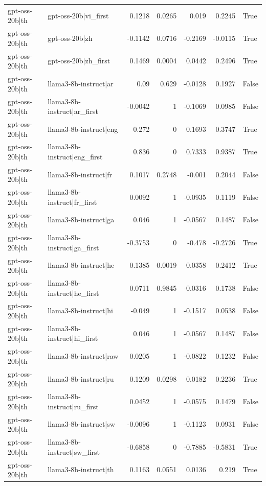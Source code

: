 \begin{table}
\begin{tabular}{l l r r r r l}
gpt-oss-20b|th & gpt-oss-20b|vi_first & 0.1218 & 0.0265 & 0.019 & 0.2245 & True \\
gpt-oss-20b|th & gpt-oss-20b|zh & -0.1142 & 0.0716 & -0.2169 & -0.0115 & True \\
gpt-oss-20b|th & gpt-oss-20b|zh_first & 0.1469 & 0.0004 & 0.0442 & 0.2496 & True \\
gpt-oss-20b|th & llama3-8b-instruct|ar & 0.09 & 0.629 & -0.0128 & 0.1927 & False \\
gpt-oss-20b|th & llama3-8b-instruct|ar_first & -0.0042 & 1 & -0.1069 & 0.0985 & False \\
gpt-oss-20b|th & llama3-8b-instruct|eng & 0.272 & 0 & 0.1693 & 0.3747 & True \\
gpt-oss-20b|th & llama3-8b-instruct|eng_first & 0.836 & 0 & 0.7333 & 0.9387 & True \\
gpt-oss-20b|th & llama3-8b-instruct|fr & 0.1017 & 0.2748 & -0.001 & 0.2044 & False \\
gpt-oss-20b|th & llama3-8b-instruct|fr_first & 0.0092 & 1 & -0.0935 & 0.1119 & False \\
gpt-oss-20b|th & llama3-8b-instruct|ga & 0.046 & 1 & -0.0567 & 0.1487 & False \\
gpt-oss-20b|th & llama3-8b-instruct|ga_first & -0.3753 & 0 & -0.478 & -0.2726 & True \\
gpt-oss-20b|th & llama3-8b-instruct|he & 0.1385 & 0.0019 & 0.0358 & 0.2412 & True \\
gpt-oss-20b|th & llama3-8b-instruct|he_first & 0.0711 & 0.9845 & -0.0316 & 0.1738 & False \\
gpt-oss-20b|th & llama3-8b-instruct|hi & -0.049 & 1 & -0.1517 & 0.0538 & False \\
gpt-oss-20b|th & llama3-8b-instruct|hi_first & 0.046 & 1 & -0.0567 & 0.1487 & False \\
gpt-oss-20b|th & llama3-8b-instruct|raw & 0.0205 & 1 & -0.0822 & 0.1232 & False \\
gpt-oss-20b|th & llama3-8b-instruct|ru & 0.1209 & 0.0298 & 0.0182 & 0.2236 & True \\
gpt-oss-20b|th & llama3-8b-instruct|ru_first & 0.0452 & 1 & -0.0575 & 0.1479 & False \\
gpt-oss-20b|th & llama3-8b-instruct|sw & -0.0096 & 1 & -0.1123 & 0.0931 & False \\
gpt-oss-20b|th & llama3-8b-instruct|sw_first & -0.6858 & 0 & -0.7885 & -0.5831 & True \\
gpt-oss-20b|th & llama3-8b-instruct|th & 0.1163 & 0.0551 & 0.0136 & 0.219 & True \\

\end{tabular}
\end{table}
